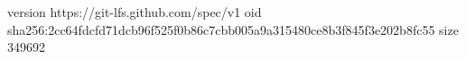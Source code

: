 version https://git-lfs.github.com/spec/v1
oid sha256:2cc64fdcfd71dcb96f525f0b86c7cbb005a9a315480ce8b3f845f3e202b8fc55
size 349692
